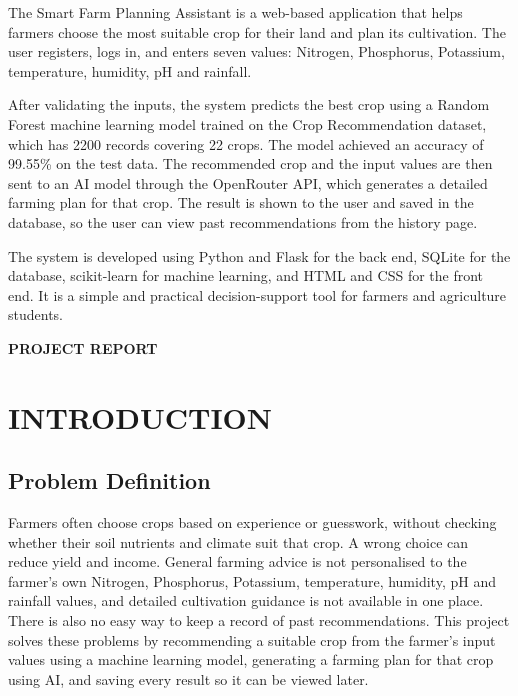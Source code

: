The Smart Farm Planning Assistant is a web-based application that helps farmers choose the most suitable crop for their land and plan its cultivation. The user registers, logs in, and enters seven values: Nitrogen, Phosphorus, Potassium, temperature, humidity, pH and rainfall.

After validating the inputs, the system predicts the best crop using a Random Forest machine learning model trained on the Crop Recommendation dataset, which has 2200 records covering 22 crops. The model achieved an accuracy of 99.55\% on the test data. The recommended crop and the input values are then sent to an AI model through the OpenRouter API, which generates a detailed farming plan for that crop. The result is shown to the user and saved in the database, so the user can view past recommendations from the history page.

The system is developed using Python and Flask for the back end, SQLite for the database, scikit-learn for machine learning, and HTML and CSS for the front end. It is a simple and practical decision-support tool for farmers and agriculture students.
%
%
%
\clearpage
{}
\tableofcontents
%
%
\clearpage
{}
\listoftables
%
%
\clearpage
{}
\listoffigures
%
%
\mainmatter
%
\clearpage
\quad\vfill
\begin{center}
{\Huge \bf PROJECT REPORT}
\end{center}
\vfill
\clearpage
%
%
% 
%
%
%  
\chapter{INTRODUCTION}

%
\section{Problem Definition}
Farmers often choose crops based on experience or guesswork, without checking whether their soil nutrients and climate suit that crop. A wrong choice can reduce yield and income. General farming advice is not personalised to the farmer’s own Nitrogen, Phosphorus, Potassium, temperature, humidity, pH and rainfall values, and detailed cultivation guidance is not available in one place. There is also no easy way to keep a record of past recommendations. This project solves these problems by recommending a suitable crop from the farmer’s input values using a machine learning model, generating a farming plan for that crop using AI, and saving every result so it can be viewed later.
